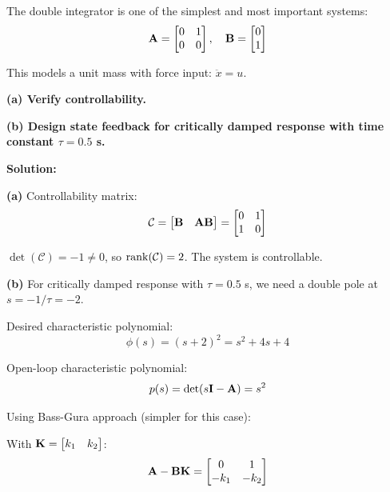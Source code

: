 \begin{example}
\label{ex:double_int}
The double integrator is one of the simplest and most important systems:
\begin{equation}
\mathbf{A} = \begin{bmatrix} 0 & 1 \\ 0 & 0 \end{bmatrix}, \quad
\mathbf{B} = \begin{bmatrix} 0 \\ 1 \end{bmatrix}
\end{equation}

This models a unit mass with force input: $\ddot{x} = u$.

\textbf{(a) Verify controllability.}

\textbf{(b) Design state feedback for critically damped response with time constant $\tau = 0.5$ s.}

\textbf{Solution:}

\textbf{(a)} Controllability matrix:
\begin{equation}
\mathcal{C} = \begin{bmatrix} \mathbf{B} & \mathbf{A}\mathbf{B} \end{bmatrix} = \begin{bmatrix} 0 & 1 \\ 1 & 0 \end{bmatrix}
\end{equation}

$\det(\mathcal{C}) = -1 \neq 0$, so $\operatorname{rank}(\mathcal{C}) = 2$. The system is controllable.

\textbf{(b)} For critically damped response with $\tau = 0.5$ s, we need a double pole at $s = -1/\tau = -2$.

Desired characteristic polynomial:
\begin{equation}
\phi(s) = (s + 2)^2 = s^2 + 4s + 4
\end{equation}

Open-loop characteristic polynomial:
\begin{equation}
p(s) = \det(s\mathbf{I} - \mathbf{A}) = s^2
\end{equation}

Using Bass-Gura approach (simpler for this case):

With $\mathbf{K} = \begin{bmatrix} k_1 & k_2 \end{bmatrix}$:
\begin{equation}
\mathbf{A} - \mathbf{B}\mathbf{K} = \begin{bmatrix} 0 & 1 \\ -k_1 & -k_2 \end{bmatrix}
\end{equation}


\end{example}
